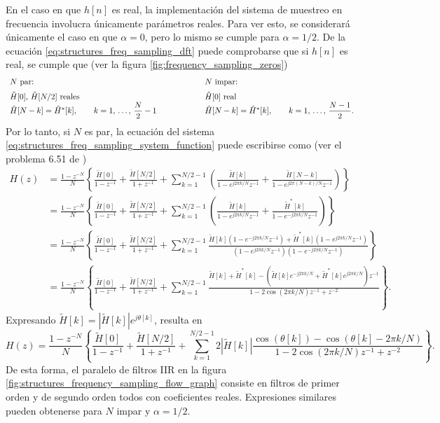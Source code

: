 \documentclass[a4paper]{report}
\begin{document}
En el caso en que \(h[n]\) es real, la implementación del sistema de muestreo en frecuencia involucra únicamente parámetros reales. Para ver esto, se considerará únicamente el caso en que \(\alpha=0\), pero lo mismo se cumple para \(\alpha=1/2\). De la ecuación \ref{eq:structures_freq_sampling_dft} puede comprobarse que si \(h[n]\) es real, se cumple que (ver la figura \ref{fig:frequency_sampling_zeros})
\[
 \begin{array}{lcl}
  N\textrm{ par:} & \qquad\qquad &N\textrm{ impar:}\\[\medskipamount]
  \tilde{H}[0],\,\tilde{H}[N/2]\textrm{ reales} & \qquad\qquad & \tilde{H}[0]\textrm{ real}\\
  \tilde{H}[N-k]=\tilde{H}^*[k],\qquad k=1,\,\dots,\,\dfrac{N}{2}-1 & \qquad\qquad & 
  \tilde{H}[N-k]=\tilde{H}^*[k],\qquad k=1,\,\dots,\,\dfrac{N-1}{2}.
 \end{array}
\]
Por lo tanto, si \(N\) es par, la ecuación del sistema \ref{eq:structures_freq_sampling_system_function} puede escribirse como (ver el problema 6.51 de \cite{oppenheim2009discrete})
\begin{align*}
 H(z)&=\frac{1-z^{-N}}{N}\left\{\frac{\tilde{H}[0]}{1-z^{-1}}+\frac{\tilde{H}[N/2]}{1+z^{-1}}+\sum_{k=1}^{N/2-1}\left(\frac{\tilde{H}[k]}{1-e^{j2\pi k/N}z^{-1}}+\frac{\tilde{H}[N-k]}{1-e^{j2\pi(N-k)/N}z^{-1}}\right)\right\}\\
  &=\frac{1-z^{-N}}{N}\left\{\frac{\tilde{H}[0]}{1-z^{-1}}+\frac{\tilde{H}[N/2]}{1+z^{-1}}+\sum_{k=1}^{N/2-1}\left(\frac{\tilde{H}[k]}{1-e^{j2\pi k/N}z^{-1}}+\frac{\tilde{H}^*[k]}{1-e^{-j2\pi k/N}z^{-1}}\right)\right\}\\
  &=\frac{1-z^{-N}}{N}\left\{\frac{\tilde{H}[0]}{1-z^{-1}}+\frac{\tilde{H}[N/2]}{1+z^{-1}}+\sum_{k=1}^{N/2-1}\frac{\tilde{H}[k](1-e^{-j2\pi k/N}z^{-1})+\tilde{H}^*[k](1-e^{j2\pi k/N}z^{-1})}{(1-e^{j2\pi k/N}z^{-1})(1-e^{-j2\pi k/N}z^{-1})}\right\}\\
  &=\frac{1-z^{-N}}{N}\left\{\frac{\tilde{H}[0]}{1-z^{-1}}+\frac{\tilde{H}[N/2]}{1+z^{-1}}+\sum_{k=1}^{N/2-1}\frac{\tilde{H}[k]+\tilde{H}^*[k]-(\tilde{H}[k]e^{-j2\pi k/N}+\tilde{H}^*[k]e^{j2\pi k/N})z^{-1}}{1-2\cos(2\pi k/N)z^{-1}+z^{-2}}\right\}.
\end{align*}
Expresando \(\tilde{H}[k]=|\tilde{H}[k]|e^{j\theta[k]}\), resulta en
\[
 H(z)=\frac{1-z^{-N}}{N}\left\{\frac{\tilde{H}[0]}{1-z^{-1}}+\frac{\tilde{H}[N/2]}{1+z^{-1}}+\sum_{k=1}^{N/2-1}2|\tilde{H}[k]|\frac{\cos(\theta[k])-\cos(\theta[k]-2\pi k/N)}{1-2\cos(2\pi k/N)z^{-1}+z^{-2}}\right\}.
\]
De esta forma, el paralelo de filtros IIR en la figura \ref{fig:structures_frequency_sampling_flow_graph} consiste en filtros de primer orden y de segundo orden todos con coeficientes reales. Expresiones similares pueden obtenerse para \(N\) impar y \(\alpha=1/2\).
\end{document}

